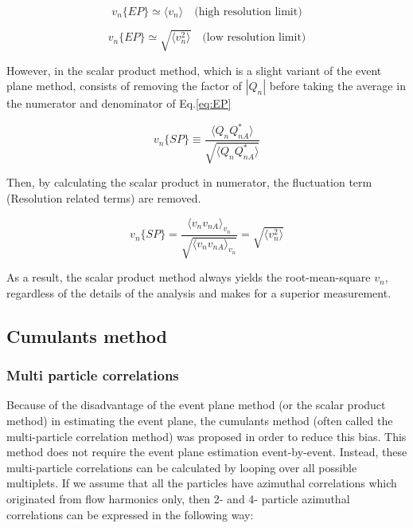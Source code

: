 	\begin{equation}
		v_n\{EP\} \simeq \langle v_n \rangle \quad \text{(high resolution limit)}
	\end{equation}

	\begin{equation}
		v_n\{EP\} \simeq \sqrt{\langle v_n^2 \rangle}  \quad \text{(low resolution limit)}
	\end{equation}
	\smallskip
	
	However, in the scalar product method, which is a slight variant of the event plane method, consists of removing the factor of $|Q_n|$ before taking the average in the numerator and denominator of Eq.\ref{eq:EP}
	
	
	\begin{equation}
		v_n\{SP\} \equiv \frac{\langle Q_n Q_{nA}^*\rangle}{\sqrt{\langle Q_n Q_{nA}^*\rangle}}
	\end{equation}
	\smallskip 
	
		Then, by calculating the scalar product in numerator, the fluctuation term (Resolution related terms) are removed. 
		
	\begin{equation}
		v_n\{SP\} = \frac{\langle v_n v_{nA} \rangle _{v_n} }{\sqrt{\langle v_n v_{nA} \rangle _{v_n}}} = \sqrt{\langle v_n^2 \rangle }
	\end{equation}	
	\smallskip
	
	As a result, the scalar product method always yields the root-mean-square $v_n$, regardless of the details of the analysis and makes for a superior measurement. 
	
\subsection{Cumulants method}

\subsubsection{Multi particle correlations}

Because of the disadvantage of the event plane method (or the scalar product method) in estimating the event plane, the cumulants method (often called the multi-particle correlation method) was proposed in order to reduce this bias. This method does not require the event plane estimation event-by-event. Instead, these multi-particle correlations can be calculated by looping over all possible multiplets. If we assume that all the particles have azimuthal correlations which originated from flow harmonics only, then 2- and 4- particle azimuthal correlations can be expressed in the following way:
	
